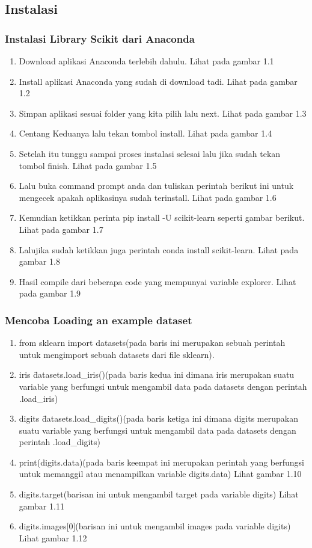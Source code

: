 \subsection{Instalasi}
\subsubsection{Instalasi Library Scikit dari Anaconda}
\begin{enumerate}
\item Download aplikasi Anaconda terlebih dahulu. Lihat pada gambar 1.1
\item Install aplikasi Anaconda yang sudah di download tadi. Lihat pada gambar 1.2
\item Simpan aplikasi sesuai folder yang kita pilih lalu next. Lihat pada gambar 1.3
\item Centang Keduanya lalu tekan tombol install. Lihat pada gambar 1.4
\item Setelah itu tunggu sampai proses instalasi selesai lalu jika sudah tekan tombol finish. Lihat pada gambar 1.5
\item Lalu buka command prompt anda dan tuliskan perintah berikut ini untuk mengecek apakah aplikasinya sudah terinstall. Lihat pada gambar 1.6
\item Kemudian ketikkan perinta pip install -U scikit-learn seperti gambar berikut. Lihat pada gambar 1.7
\item Lalujika sudah  ketikkan juga perintah conda install scikit-learn. Lihat pada gambar 1.8
\item Hasil compile dari beberapa code yang mempunyai variable explorer. Lihat pada gambar 1.9
\end{enumerate}
\subsubsection{Mencoba Loading an example dataset}
\begin{enumerate}
\item from sklearn import datasets(pada baris ini merupakan sebuah perintah untuk mengimport sebuah datasets dari file sklearn).
\item iris \= datasets.load\_iris()(pada baris kedua ini dimana iris merupakan suatu variable yang berfungsi untuk mengambil data pada datasets dengan perintah .load\_iris)
\item digits \= datasets.load\_digits()(pada baris ketiga ini dimana digits merupakan suatu variable yang berfungsi untuk mengambil data pada datasets dengan perintah .load\_digits)
\item print(digits.data)(pada baris keempat ini merupakan perintah yang berfungsi untuk memanggil atau menampilkan variable digits.data) Lihat gambar 1.10
\item digits.target(barisan ini untuk mengambil target pada variable digits) Lihat gambar 1.11
\item digits.images[0](barisan ini untuk mengambil images pada variable digits) Lihat gambar 1.12
\end{enumerate}

